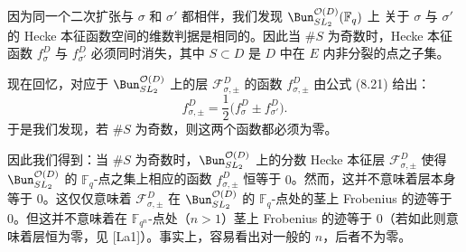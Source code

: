 

因为同一个二次扩张与 $\sigma$ 和 $\sigma'$ 都相伴，我们发现 $\Bun^{\mathcal{O}(D)}_{SL_2}(\mathbb{F}_q)$ 上
关于 $\sigma$ 与 $\sigma'$ 的 Hecke 本征函数空间的维数判据是相同的。因此当 $\#S$ 为奇数时，Hecke 本征函数 $f^D_\sigma$ 与 $f^D_{\sigma'}$ 必须同时消失，其中 $S\subset D$ 是 $D$ 中在 $E$ 内非分裂的点之子集。

现在回忆，对应于 $\Bun^{\mathcal{O}(D)}_{SL_2}$ 上的层 $\mathcal{F}^D_{\sigma,\pm}$ 的函数 $f^D_{\sigma,\pm}$ 由公式 (8.21) 给出：
\begin{equation}\tag{8.24}
f^D_{\sigma,\pm} = \frac{1}{2}\bigl(f^D_\sigma \pm f^D_{\sigma'}\bigr).
\end{equation}
于是我们发现，若 $\#S$ 为奇数，则这两个函数都必须为零。

因此我们得到：当 $\#S$ 为奇数时，$\Bun^{\mathcal{O}(D)}_{SL_2}$ 上的分数 Hecke 本征层 $\mathcal{F}^D_{\sigma,\pm}$ 使得 $\Bun^{\mathcal{O}(D)}_{SL_2}$ 的 $\mathbb{F}_q$-点之集上相应的函数 $f^D_{\sigma,\pm}$ 恒等于 $0$。然而，这并不意味着层本身等于 $0$。这仅仅意味着 $\mathcal{F}^D_{\sigma,\pm}$ 在 $\Bun^{\mathcal{O}(D)}_{SL_2}$ 的 $\mathbb{F}_q$-点处的茎上 Frobenius 的迹等于 $0$。但这并不意味着在 $\mathbb{F}_{q^n}$-点处（$n > 1$）茎上 Frobenius 的迹等于 $0$（若如此则意味着层恒为零，见 [La1]）。事实上，容易看出对一般的 $n$，后者不为零。

